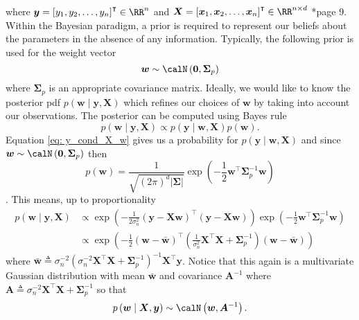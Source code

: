 where $\bm{y} = \left[ y_1 , y_2 , \ldots , y_n \right]^{\intercal} \in \RR^n$ and $\bm{X} = \left[ \bm{x}_1 , \bm{x}_2 , \ldots , \bm{x}_n \right]^{\intercal} \in \RR^{n \times d}$ \cite{RasmussenCarlEdward2006Gpfm}*{page 9}. Within the Bayesian paradigm, a prior is required to represent our beliefs about the parameters in the absence of any information. Typically, the following prior is used for the weight vector
\[
    \bm{w} \sim \calN \left( \bm{0}, \bm{\Sigma}_p \right)
\]
where $\bm{\Sigma}_p$ is an appropriate covariance matrix. Ideally, we would like to know the posterior pdf $p \left( \bm{w} \mid \bm{y} , \bm{X} \right)$ which refines our choices of $\bm{w}$ by taking into account our observations. The posterior can be computed using Bayes rule
\[
    p \left( \bm{w} \mid \bm{y} , \bm{X} \right) \propto p \left( \bm{y} \mid \bm{w} , \bm{X} \right) p \left( \bm{w} \right).
\]
Equation \ref{eq: y_cond_X_w} gives us a probability for $p \left( \bm{y} \mid \bm{w} , \bm{X} \right)$ and since $\bm{w} \sim \calN \left( \bm{0}, \bm{\Sigma}_p \right)$ then
\begin{equation*}
    p \left( \bm{w} \right) = \frac{1}{\sqrt{\left( 2 \pi \right)^{d} \left| \bm{\Sigma} \right|}} \exp \left( -\frac{1}{2} \bm{w}^{\intercal} \bm{\Sigma}_p^{-1} \bm{w} \right)
\end{equation*}
\cite{KroeseDirkP2014SMaC}. This means, up to proportionality
\begin{align*}
    p \left( \bm{w} \mid \bm{y} , \bm{X} \right)
     & \propto \exp \left( - \frac{1}{2 \sigma_n^2} \left( \bm{y} - \bm{X} \bm{w} \right)^{\intercal} \left( \bm{y} - \bm{X} \bm{w} \right) \right) \exp \left( -\frac{1}{2} \bm{w}^{\intercal} \bm{\Sigma}_p^{-1} \bm{w} \right) \\
     & \propto \exp \left( - \frac{1}{2} \left( \bm{w} - \bar{\bm{w}} \right)^{\intercal} \left( \frac{1}{\sigma^2_n} \bm{X}^{\intercal} \bm{X} + \bm{\Sigma}_p^{-1} \right) \left( \bm{w} - \bar{\bm{w}} \right) \right)
\end{align*}
where $\bar{\bm{w}} \triangleq \sigma_{n}^{-2} \left( \sigma_{n}^{-2} \bm{X}^{\intercal} \bm{X} + \bm{\Sigma}_p^{-1} \right)^{-1} \bm{X}^{\intercal} \bm{y}$. Notice that this again is a multivariate Gaussian distribution with mean $\bar{\bm{w}}$ and covariance $\bm{A}^{-1}$ where $\bm{A} \triangleq \sigma_{n}^{-2} \bm{X}^{\intercal} \bm{X} + \bm{\Sigma}_p^{-1}$ so that
\begin{equation*}
    p \left( \bm{w} \mid \bm{X} , \bm{y} \right) \sim \calN \left( \bm{w} , \bm{A}^{-1} \right).
\end{equation*}
